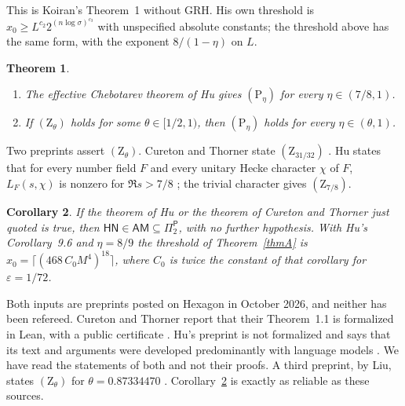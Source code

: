 \documentclass[11pt]{amsart}
\newtheorem{theorem}{Theorem}
\newtheorem{corollaryx}[theorem]{Corollary}
\theoremstyle{definition}
\theoremstyle{remark}
\newcommand{\cl}[1]{\mathsf{#1}}
\newcommand{\HN}{\cl{HN}}
\newcommand{\AM}{\cl{AM}}
\newcommand{\Pitwo}{\Pi_2^{\cl P}}
\newcommand{\Zh}[1]{(\mathrm Z_{#1})}
\newcommand{\Ph}[1]{(\mathrm P_{#1})}
\begin{document}
This is Koiran's Theorem~1 without GRH. His own threshold is $x_0\ge L^{c_2}2^{(n\log\sigma)^{c_3}}$ with unspecified absolute constants; the threshold above has the same form, with the exponent $8/(1-\eta)$ on $L$.

\begin{theorem}\label{thmB}
\begin{enumerate}
\item[(a)] The effective Chebotarev theorem of Hu \cite[Corollary~9.6, p.~56]{Hu} gives $\Ph\eta$ for every $\eta\in(7/8,1)$.
\item[(b)] If $\Zh\theta$ holds for some $\theta\in[1/2,1)$, then $\Ph\eta$ holds for every $\eta\in(\theta,1)$.
\end{enumerate}
\end{theorem}

Two preprints assert $\Zh\theta$. Cureton and Thorner state $\Zh{31/32}$ \cite[Theorem~1.1, p.~3]{CT}. Hu states that for every number field $F$ and every unitary Hecke character $\chi$ of $F$, $L_F(s,\chi)$ is nonzero for $\Re s>7/8$ \cite[Theorem~1.2, p.~2]{Hu}; the trivial character gives $\Zh{7/8}$.

\begin{corollaryx}\label{corC}
If the theorem of Hu or the theorem of Cureton and Thorner just quoted is true, then $\HN\in\AM\subseteq\Pitwo$, with no further hypothesis. With Hu's Corollary~9.6 and $\eta=8/9$ the threshold of Theorem~\ref{thmA} is $x_0=\lceil(468\,C_0M^4)^{18}\rceil$, where $C_0$ is twice the constant of that corollary for $\varepsilon=1/72$.
\end{corollaryx}

Both inputs are preprints posted on Hexagon in October 2026, and neither has been refereed. Cureton and Thorner report that their Theorem~1.1 is formalized in Lean, with a public certificate \cite[abstract and \S15]{CT}. Hu's preprint is not formalized and says that its text and arguments were developed predominantly with language models \cite[p.~58]{Hu}. We have read the statements of both and not their proofs. A third preprint, by Liu, states $\Zh\theta$ for $\theta=0.87334470$ \cite[Theorem~7.21]{Liu}. Corollary~\ref{corC} is exactly as reliable as these sources.
\end{document}
